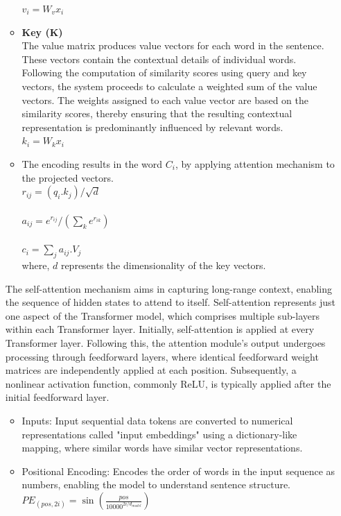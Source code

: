 \documentclass[preprint,12pt]{elsarticle}
\begin{document}
\begin{itemize}
\begin{itemize}
		$v_{i}=W_{v}x_{i}$
		\item \textbf{Key (K)}\\The value matrix produces value vectors for each word in the sentence. These vectors contain the contextual details of individual words. Following the computation of similarity scores using query and key vectors, the system proceeds to calculate a weighted sum of the value vectors. The weights assigned to each value vector are based on the similarity scores, thereby ensuring that the resulting contextual representation is predominantly influenced by relevant words.\\
		$k_{i}=W_{k}x_{i}$
		\item The encoding results in the word $C_i$, by applying attention mechanism to the projected vectors.	\\
		$r_{ij}=(q_{i}.k_{j})/\sqrt{d}$\\\\
		$a_{ij}=e^{r_{ij}}/(\sum_{k}^{} e^{r_{ik}})$\\\\
		$c_{i}=\sum_{j}^{} a_{ij}.V_{j}$\\
		where, $d$ represents the dimensionality of the key vectors.
	\end{itemize}
	The self-attention mechanism aims in capturing long-range context, enabling the sequence of hidden states to attend to itself. Self-attention represents just one aspect of the Transformer model, which comprises multiple sub-layers within each Transformer layer. Initially, self-attention is applied at every Transformer layer. Following this, the attention module's output undergoes processing through feedforward layers, where identical feedforward weight matrices are independently applied at each position. Subsequently, a nonlinear activation function, commonly ReLU, is typically applied after the initial feedforward layer.
	\begin{itemize}
		\item Inputs: Input sequential data tokens are converted to numerical representations called "input embeddings" using a dictionary-like mapping, where similar words have similar vector representations.
		
		\item Positional Encoding: Encodes the order of words in the input sequence as numbers, enabling the model to understand sentence structure.\\
		$P E_{(pos,2i)}=\sin (\frac{pos}{10000^{2i/{d_{model}}}})$\\
		

\end{itemize}
\end{itemize}
\end{document}
